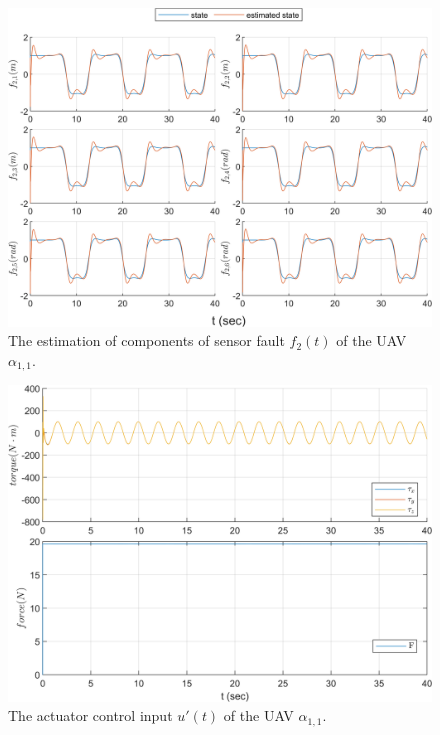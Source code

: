 \documentclass[journal,12pt,onecolumn,draftclsnofoot,]{IEEEtran}
\begin{document}
\begin{figure}[htbp]
    \centering
    \includegraphics[scale=.57]{fig/uav (3).png}\caption{The estimation of components of sensor fault $f_2(t)$ of the UAV $\alpha_{1,1}$.}%
    \label{fig:UAV, fs}
\end{figure}
\begin{figure}[htbp]
    \centering
    \includegraphics[scale=.57]{fig/uav (4).png}\caption{The actuator control input $u'(t)$ of the UAV $\alpha_{1,1}$.}%
    \label{fig:UAV, control}
\end{figure}
\end{document}
